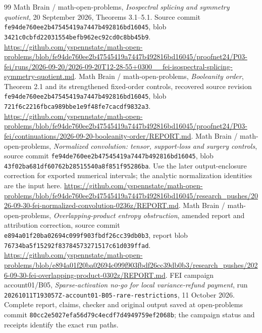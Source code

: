 \documentclass[11pt]{article}
\begin{document}
\begin{thebibliography}{99}
 Math Brain / math-open-problems,
\emph{Isospectral splicing and symmetry quotient},
20 September 2026, Theorems 3.1--5.1.
Source commit \texttt{fe94de760ee2b47545419a7447b492816bd16045},
blob \texttt{3421c0cbfd22031554befb962ec92cd0c8bb45b9}.
\url{https://github.com/yspennstate/math-open-problems/blob/fe94de760ee2b47545419a7447b492816bd16045/proofnet24/P03-fei/runs/2026-09-20/2026-09-20T12-28-55+0300__fei-isospectral-splicing-symmetry-quotient.md}.
 Math Brain / math-open-problems,
\emph{Booleanity order}, Theorem 2.1 and its strengthened
fixed-order controls, recovered source revision
\texttt{fe94de760ee2b47545419a7447b492816bd16045},
blob \texttt{721f6c2216fbca989bbe1e9f48fe7cacdf9832a3}.
\url{https://github.com/yspennstate/math-open-problems/blob/fe94de760ee2b47545419a7447b492816bd16045/proofnet24/P03-fei/continuations/2026-09-20-booleanity-order/REPORT.md}.
 Math Brain / math-open-problems,
\emph{Normalized convolution: tensor, support-loss and surgery controls},
source commit \texttt{fe94de760ee2b47545419a7447b492816bd16045},
blob \texttt{43f02ba681df60762b28515540a8f851f95286ba}.
Use the later output-enclosure correction for exported numerical
intervals; the analytic normalization identities are the input here.
\url{https://github.com/yspennstate/math-open-problems/blob/fe94de760ee2b47545419a7447b492816bd16045/research_pushes/2026-09-30-fei-normalized-convolution-0236z/REPORT.md}.
 Math Brain / math-open-problems,
\emph{Overlapping-product entropy obstruction}, amended report
and attribution correction, source commit
\texttt{e894a01f20ba02694c099f903fbdf26cc39db0b3},
report blob \texttt{76734ba5f15292f83784573271517c61d039ffad}.
\url{https://github.com/yspennstate/math-open-problems/blob/e894a01f20ba02694c099f903fbdf26cc39db0b3/research_pushes/2026-09-30-fei-overlapping-product-0302z/REPORT.md}.
 FEI campaign account01/B05,
\emph{Sparse-activation no-go for local variance-refund payment},
run \texttt{20261011T193057Z-account01-B05-rare-restrictions},
11 October 2026. Complete report, claims, checker and original
output saved at open-problems commit
\texttt{80cc2e5027efa56d79c4ecdf7d4949759ef2068b};
the campaign status and receipts identify the exact run paths.

\end{thebibliography}
\end{document}
